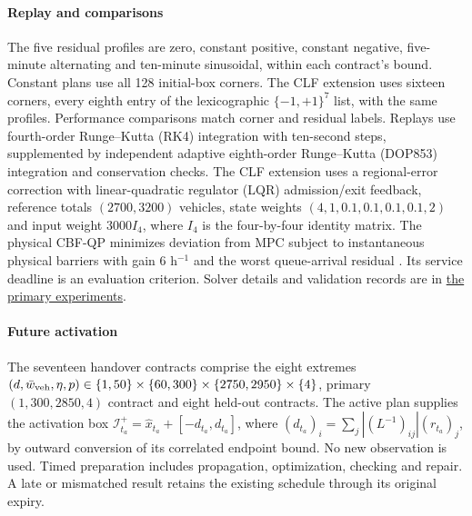 \documentclass[preprint,12pt]{elsarticle}
\newcommand{\reproductiondetails}[1]{\href{https://github.com/AlienEslami/agentic-perimeter-runtime-certification/blob/main/paper/supporting_materials/REPRODUCING_THE_REDUCED_PAPER.md}{#1}}
\begin{document}
\paragraph{Replay and comparisons}
The five residual profiles are zero, constant positive, constant negative,
five-minute alternating and ten-minute sinusoidal, within each contract's
bound. Constant plans use all 128 initial-box corners. The CLF extension
uses sixteen corners, every eighth entry of the lexicographic
$\{-1,+1\}^7$ list, with the same profiles. Performance comparisons match
corner and residual labels. Replays use fourth-order Runge--Kutta
(RK4) integration with ten-second steps, supplemented by independent
adaptive eighth-order Runge--Kutta (DOP853) integration and conservation
checks. The CLF extension uses a regional-error correction with
linear-quadratic regulator (LQR) admission/exit feedback, reference
totals $(2700,3200)$ vehicles, state weights $(4,1,0.1,0.1,0.1,0.1,2)$
and input weight $3000I_4$, where $I_4$ is the four-by-four identity
matrix. The physical CBF-QP minimizes deviation from
MPC subject to instantaneous physical barriers with gain $6$ h$^{-1}$
and the worst queue-arrival residual \cite{ames2017}. Its service deadline
is an evaluation criterion. Solver details and validation records are in
\reproductiondetails{the primary experiments}.

\paragraph{Future activation}
\label{supp:detail:sec:delayed-handover-results}
\label{app:sequential-handover}
The seventeen handover contracts comprise the eight extremes
$(d,\bar w_{\rm veh},\eta,p)\in\{1,50\}\times\{60,300\}\times
\{2750,2950\}\times\{4\}$, primary $(1,300,2850,4)$ contract and eight
held-out contracts. The active plan supplies the activation box
$\mathcal I_{t_a}^+=\widehat x_{t_a}+[-d_{t_a},d_{t_a}]$, where
$(d_{t_a})_i=\sum_j|(L^{-1})_{ij}|(r_{t_a})_j$, by outward conversion of its
correlated endpoint bound. No new observation is used. Timed preparation
includes propagation, optimization, checking and repair. A late or
mismatched result retains the existing schedule through its original expiry.
\end{document}
